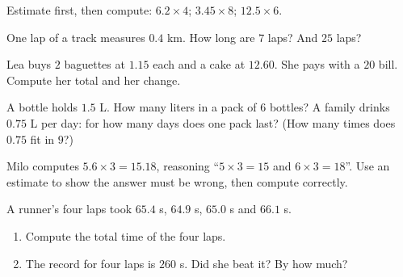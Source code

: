 \begin{exercise}[$\star$]\label{exo:g5:decimalops:6}
Estimate first, then compute: $6.2 \times 4$; \quad
$3.45 \times 8$; \quad $12.5 \times 6$.
\end{exercise}

\begin{exercise}[$\star$]\label{exo:g5:decimalops:7}
One lap of a track measures $0.4$ km. How long are $7$ laps? And
$25$ laps?
\end{exercise}

\begin{exercise}[$\star$]\label{exo:g5:decimalops:8}
Lea buys $2$ baguettes at $1.15$ each and a cake at $12.60$. She
pays with a $20$ bill. Compute her total and her change.
\end{exercise}

\begin{exercise}[$\star$]\label{exo:g5:decimalops:9}
A bottle holds $1.5$ L. How many liters in a pack of $6$ bottles?
A family drinks $0.75$ L per day: for how many days does one pack
last? (How many times does $0.75$ fit in $9$?)
\end{exercise}

\begin{exercise}[$\star\star$]\label{exo:g5:decimalops:10}
Milo computes $5.6 \times 3 = 15.18$, reasoning ``$5 \times 3 = 15$
and $6 \times 3 = 18$''. Use an estimate to show the answer must be
wrong, then compute correctly.
\end{exercise}

\begin{exercise}[$\star\star$]\label{exo:g5:decimalops:11}
A runner's four laps took $65.4$ s, $64.9$ s, $65.0$ s and
$66.1$ s.
\begin{enumerate}
  \item Compute the total time of the four laps.
  \item The record for four laps is $260$ s. Did she beat it? By how
        much?
\end{enumerate}
\end{exercise}
